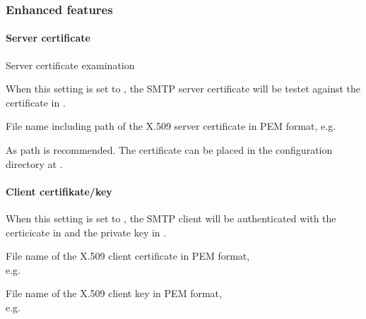 \subsubsection {Enhanced features}

\paragraph {Server certificate}
Server certificate examination

\begin {description}
    

    When this setting is set to , the SMTP server certificate will be
    testet against the certificate in .

    
    File name including path of the X.509 server certificate in PEM format,
    e.g. 
    
    As path  is recommended.
    The certificate can be placed in the configuration directory at 
    .

\end {description}

\paragraph {Client certifikate/key}
\begin {description}


    When this setting is set to , the SMTP client will be authenticated
    with the certicicate in 
    and the private key in . 
    
    
    File name of the X.509 client certificate in PEM format, \\
    e.g. 

    
    File name of the X.509 client key in PEM format, \\
    e.g. 
    
\end {description}

